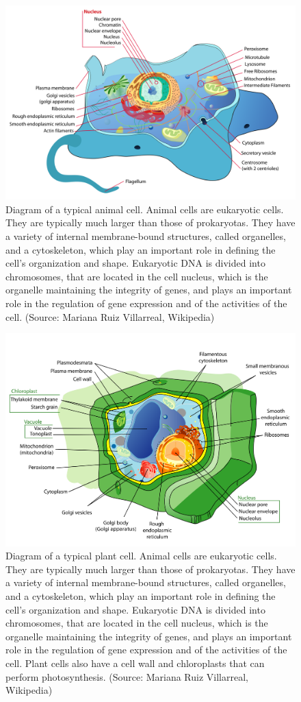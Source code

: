 \documentclass[
  11pt,
]{book}
\begin{document}
\begin{figure}

{\centering \includegraphics[width=0.5\linewidth]{./figs/animalCell} 

}

\caption{Diagram of a typical animal cell. Animal cells are eukaryotic cells. They are typically much larger than those of prokaryotas. They have a variety of internal membrane-bound structures, called organelles, and a cytoskeleton, which play an important role in defining the cell's organization and shape. Eukaryotic DNA is divided into chromosomes, that are located in the cell nucleus, which is the organelle maintaining the integrity of genes, and plays an important role in the regulation of gene expression and of the activities of the cell. (Source: Mariana Ruiz Villarreal, Wikipedia)}\label{fig:animalCell}
\end{figure}

\begin{figure}

{\centering \includegraphics[width=0.5\linewidth]{./figs/plantCell} 

}

\caption{Diagram of a typical plant cell. Animal cells are eukaryotic cells. They are typically much larger than those of prokaryotas. They have a variety of internal membrane-bound structures, called organelles, and a cytoskeleton, which play an important role in defining the cell's organization and shape. Eukaryotic DNA is divided into chromosomes, that are located in the cell nucleus, which is the organelle maintaining the integrity of genes, and plays an important role in the regulation of gene expression and of the activities of the cell. Plant cells also have a cell wall and chloroplasts that can perform photosynthesis. (Source: Mariana Ruiz Villarreal, Wikipedia)}\label{fig:plantCell}
\end{figure}
\end{document}
